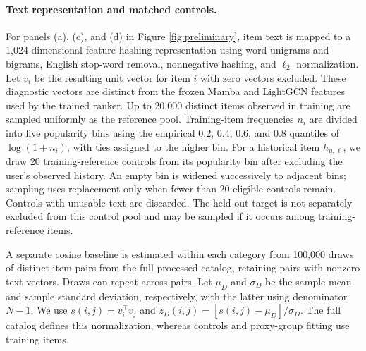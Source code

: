 ﻿\documentclass[sigconf,anonymous,review]{acmart}
\begin{document}
\paragraph{Text representation and matched controls.}
For panels (a), (c), and (d) in Figure \ref{fig:preliminary}, item text is mapped to a 1,024-dimensional feature-hashing representation using word unigrams and bigrams, English stop-word removal, nonnegative hashing, and $\ell_2$ normalization. Let $v_i$ be the resulting unit vector for item $i$ with zero vectors excluded. These diagnostic vectors are distinct from the frozen Mamba and LightGCN features used by the trained ranker. Up to 20,000 distinct items observed in training are sampled uniformly as the reference pool. Training-item frequencies $n_i$ are divided into five popularity bins using the empirical $0.2$, $0.4$, $0.6$, and $0.8$ quantiles of $\log(1+n_i)$, with ties assigned to the higher bin. For a historical item $h_{u,\ell}$, we draw 20 training-reference controls from its popularity bin after excluding the user's observed history. An empty bin is widened successively to adjacent bins; sampling uses replacement only when fewer than 20 eligible controls remain. Controls with unusable text are discarded. The held-out target is not separately excluded from this control pool and may be sampled if it occurs among training-reference items.

A separate cosine baseline is estimated within each category from 100,000 draws of distinct item pairs from the full processed catalog, retaining pairs with nonzero text vectors. Draws can repeat across pairs. Let $\mu_D$ and $\sigma_D$ be the sample mean and sample standard deviation, respectively, with the latter using denominator $N-1$. We use $s(i,j)=v_i^\top v_j$ and $z_D(i,j)=[s(i,j)-\mu_D]/\sigma_D$. The full catalog defines this normalization, whereas controls and proxy-group fitting use training items.
\end{document}
